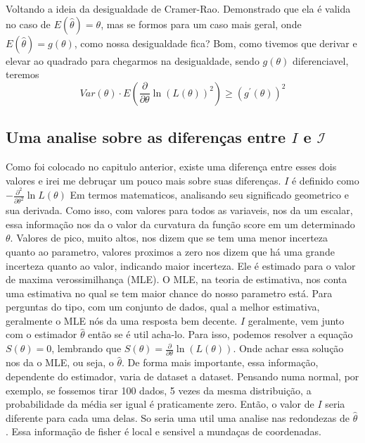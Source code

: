 Voltando a ideia da desigualdade de Cramer-Rao. Demonstrado que ela é valida no caso de
\(E(\hat{\theta})=\theta\), mas se formos para um caso mais geral, onde
\(E(\hat{\theta})=g(\theta)\), como nossa desigualdade fica? Bom, como tivemos que derivar e elevar
ao quadrado para chegarmos na desigualdade, sendo \(g(\theta )\) diferenciavel, teremos
\begin{equation}\label{eq:Cramer-Rao para caso gerais}
    Var(\theta ) \cdot E(\frac{\partial}{\partial \theta } \ln (L(\theta ))^{2} )\geq (g^\prime (\theta ))^{2} 
\end{equation}
\subsection{Uma analise sobre as diferenças entre \(I\) e \(\mathcal{I} \)}

Como foi colocado no capitulo anterior, existe uma diferença entre esses dois valores e irei me
debruçar um pouco mais sobre suas diferenças. \(I\) é definido como \(-\frac{\partial^{2}}{\partial \theta^{2} }\ln L(\theta) \)  
Em termos matematicos, analisando seu significado geometrico e sua derivada. Como isso, com valores
para todos as variaveis, nos da um escalar, essa informação nos da o valor da curvatura da função
score em um determinado \(\theta \). Valores de pico, muito altos, nos dizem que se tem uma menor
incerteza quanto ao parametro, valores proximos a zero nos dizem que há uma grande incerteza quanto
ao valor, indicando maior incerteza. Ele é estimado para o valor de maxima verossimilhança (MLE). O
MLE, na teoria de estimativa, nos conta uma estimativa no qual se tem maior chance do nosso
parametro está. Para perguntas do tipo, com um conjunto de dados, qual a melhor estimativa,
geralmente o MLE nós da uma resposta bem decente. \(I\) geralmente, vem junto com o estimador
\(\hat{\theta} \) então se é util acha-lo. Para isso, podemos resolver a equação \(S(\theta )=0\),
lembrando que \(S(\theta)=\frac{\partial }{\partial \theta } \ln (L(\theta))\). Onde achar essa
solução nos da o MLE, ou seja, o \(\hat{\theta} \). De forma mais importante, essa informação,
dependente do estimador, varia de dataset a dataset. Pensando numa normal, por exemplo, se fossemos
tirar 100 dados, 5 vezes da mesma distribuição, a probabilidade da média ser igual é praticamente
zero. Então, o valor de \(I\) seria diferente para cada uma delas. So seria uma util uma analise nas
redondezas de \(\hat{\theta} \). Essa informação de fisher é local e sensivel a mundaças de
coordenadas. \par


